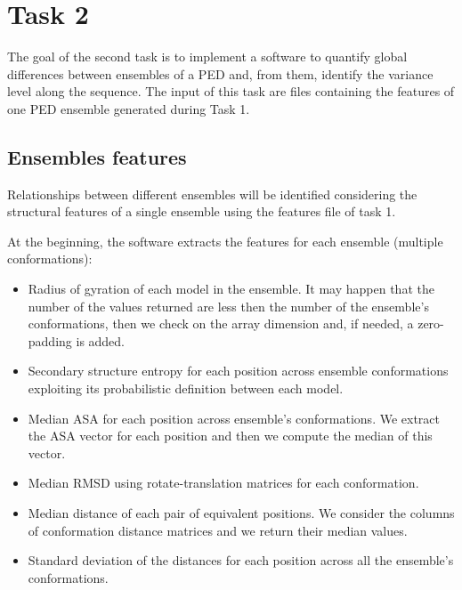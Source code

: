 \section{Task 2}\label{sec:task2}

The goal of the second task is to implement a software to quantify global differences between ensembles of a PED and, from them, identify the variance level along the sequence. The input of this task are files containing the features of one PED ensemble generated during Task 1.

\subsection{Ensembles features}
Relationships between different ensembles will be identified considering the structural features of a single ensemble using the features file of task 1.

At the beginning, the software extracts the features for each ensemble (multiple conformations):
\begin{itemize}
\item Radius of gyration of each model in the ensemble. It may happen that the number of the values returned are less then the number of the ensemble's conformations, then we check on the array dimension and, if needed, a zero-padding is added.
\item Secondary structure entropy for each position across ensemble conformations exploiting its probabilistic definition between each model. 
\item Median ASA for each position across ensemble's conformations. We extract the ASA vector for each position and then we compute the median of this vector. 
\item Median RMSD using rotate-translation matrices for each conformation.
\item Median distance of each pair of equivalent positions. We consider the columns of conformation distance matrices and we return their median values.
\item Standard deviation of the distances for each position across all the ensemble's conformations.
\end{itemize}


